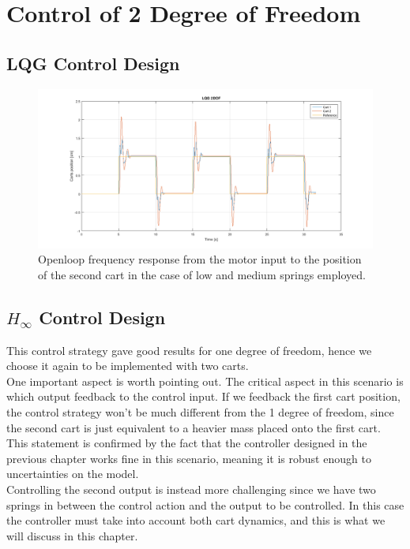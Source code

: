 {\let\clearpage\relax \chapter{Control of 2 Degree of Freedom}}
\section{LQG Control Design}

\begin{figure}[h]
\centering
\includegraphics[width=0.5\linewidth]{img/lqg_2dof.png}
\caption{Openloop frequency response from the motor input to the position of the second cart in the case of low and medium springs employed.}
\label{fig:lqg2dof}
\end{figure}
\section{$H_\infty$ Control Design}
This control strategy gave good results for one degree of freedom, hence we choose it again to be implemented with two carts.\\

One important aspect is worth pointing out. The critical aspect in this scenario is which output feedback to the control input. If we feedback the first cart position, the control strategy won't be much different from the 1 degree of freedom, since the second cart is just equivalent to a heavier mass placed onto the first cart. This statement is confirmed by the fact that the controller designed in the previous chapter works fine in this scenario, meaning it is robust enough to uncertainties on the model.\\

Controlling the second output is instead more challenging since we have two springs in between the control action and the output to be controlled. In this case the controller must take into account both cart dynamics, and this is what we will discuss in this chapter.\\


